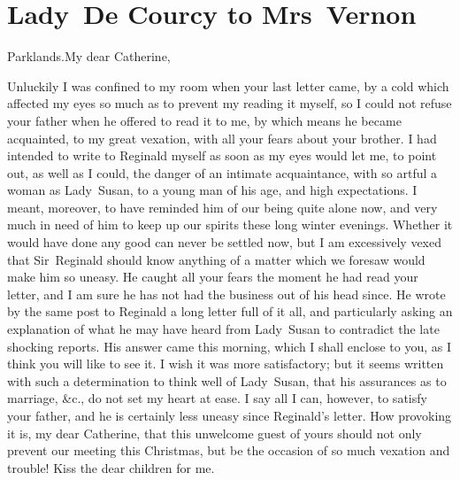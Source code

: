 \chapter{Lady~De Courcy to Mrs~Vernon}
  
  \begin{mail}{Parklands.}{My dear Catherine,}

Unluckily I was confined to my room when your last letter came, by a cold which affected my eyes so much as to prevent my reading it myself, so I could not refuse your father when he offered to read it to me, by which means he became acquainted, to my great vexation, with all your fears about your brother. I had intended to write to Reginald myself as soon as my eyes would let me, to point out, as well as I could, the danger of an intimate acquaintance, with so artful a woman as Lady~Susan, to a young man of his age, and high expectations. I meant, moreover, to have reminded him of our being quite alone now, and very much in need of him to keep up our spirits these long winter evenings. Whether it would have done any good can never be settled now, but I am excessively vexed that Sir~Reginald should know anything of a matter which we foresaw would make him so uneasy. He caught all your fears the moment he had read your letter, and I am sure he has not had the business out of his head since. He wrote by the same post to Reginald a long letter full of it all, and particularly asking an explanation of what he may have heard from Lady~Susan to contradict the late shocking reports. His answer came this morning, which I shall enclose to you, as I think you will like to see it. I wish it was more satisfactory; but it seems written with such a determination to think well of Lady~Susan, that his assurances as to marriage, \&c., do not set my heart at ease. I say all I can, however, to satisfy your father, and he is certainly less uneasy since Reginald's letter. How provoking it is, my dear Catherine, that this unwelcome guest of yours should not only prevent our meeting this Christmas, but be the occasion of so much vexation and trouble! Kiss the dear children for me. 

\end{mail}